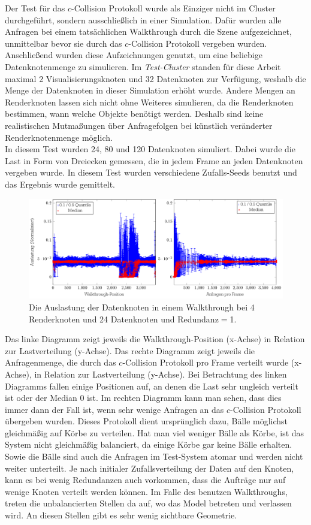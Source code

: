 Der Test für das $c$-Collision Protokoll wurde als Einziger nicht im Cluster durchgeführt, sondern ausschließlich in einer Simulation. Dafür wurden alle Anfragen bei einem tatsächlichen Walkthrough durch die Szene aufgezeichnet, unmittelbar bevor sie durch das $c$-Collision Protokoll vergeben wurden. Anschließend wurden diese Aufzeichnungen genutzt, um eine beliebige Datenknotenmenge zu simulieren. Im \textit{Test-Cluster} standen für diese Arbeit maximal 2 Visualisierungsknoten und 32 Datenknoten zur Verfügung, weshalb die Menge der Datenknoten in dieser Simulation erhöht wurde. Andere Mengen an Renderknoten lassen sich nicht ohne Weiteres simulieren, da die Renderknoten bestimmen, wann welche Objekte benötigt werden. Deshalb sind keine realistischen Mutmaßungen über Anfragefolgen bei künstlich veränderter Renderknotenmenge möglich.\\
In diesem Test wurden 24, 80 und 120 Datenknoten simuliert. Dabei wurde die Last in Form von Dreiecken gemessen, die in jedem Frame an jeden Datenknoten vergeben wurde. In diesem Test wurden verschiedene Zufalls-Seeds benutzt und das Ergebnis wurde gemittelt.\\
\begin{figure}
\centering
\includegraphics[scale=0.75]{images/diag_cCol_red1_render4_data24_2x.pdf}
  \caption{\label{fig:eval:cCol1}Die Auslastung der Datenknoten in einem Walkthrough bei 4 Renderknoten und 24 Datenknoten und Redundanz$=$1.}
\end{figure}
Das linke Diagramm zeigt jeweils die Walkthrough-Position (x-Achse) in Relation zur Lastverteilung (y-Achse). Das rechte Diagramm zeigt jeweils die Anfragenmenge, die durch das $c$-Collision Protokoll pro Frame verteilt wurde (x-Achse), in Relation zur Lastverteilung (y-Achse). Bei Betrachtung des linken Diagramms fallen einige Positionen auf, an denen die Last sehr ungleich verteilt ist oder der Median 0 ist. Im rechten Diagramm kann man sehen, dass dies immer dann der Fall ist, wenn sehr wenige Anfragen an das $c$-Collision Protokoll übergeben wurden. Dieses Protokoll dient ursprünglich dazu, Bälle möglichst gleichmäßig auf Körbe zu verteilen. Hat man viel weniger Bälle als Körbe, ist das System nicht gleichmäßig balanciert, da einige Körbe gar keine Bälle erhalten. Sowie die Bälle sind auch die Anfragen im Test-System atomar und werden nicht weiter unterteilt. Je nach initialer Zufallsverteilung der Daten auf den Knoten, kann es bei wenig Redundanzen auch vorkommen, dass die Aufträge nur auf wenige Knoten verteilt werden können. Im Falle des benutzen Walkthroughs, treten die unbalancierten Stellen da auf, wo das Model betreten und verlassen wird. An diesen Stellen gibt es sehr wenig sichtbare Geometrie.\\
